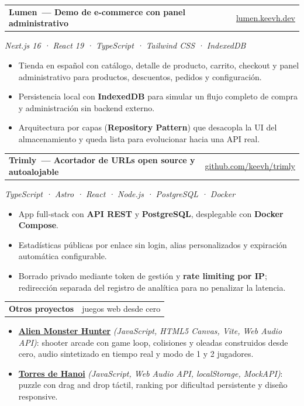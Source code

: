 \documentclass[a4paper,10.5pt]{article}
\makeatletter
\newcommand{\entry}[2]{%
  \noindent\begin{tabularx}{\textwidth}{@{}X@{}r@{}}
    \textbf{#1} & {\color{muted}\small #2}
  \end{tabularx}\par
}
\newcommand{\stack}[1]{{\color{accentdark}\small\itshape #1}\par\vspace{1pt}}
\makeatother
\begin{document}
\entry{Lumen~\textcolor{muted}{\small— Demo de e-commerce con panel administrativo}}{\href{https://lumen.keevh.dev/}{\color{accentdark}\small lumen.keevh.dev}}
\stack{Next.js 16 · React 19 · TypeScript · Tailwind CSS · IndexedDB}
\begin{itemize}
  \small
  \item Tienda en español con catálogo, detalle de producto, carrito, checkout y panel administrativo para productos, descuentos, pedidos y configuración.
  \item Persistencia local con \textbf{IndexedDB} para simular un flujo completo de compra y administración sin backend externo.
  \item Arquitectura por capas (\textbf{Repository Pattern}) que desacopla la UI del almacenamiento y queda lista para evolucionar hacia una API real.
\end{itemize}
\vspace{4pt}

\entry{Trimly~\textcolor{muted}{\small— Acortador de URLs open source y autoalojable}}{\href{https://github.com/keevh/trimly}{\color{accentdark}\small github.com/keevh/trimly}}
\stack{TypeScript · Astro · React · Node.js · PostgreSQL · Docker}
\begin{itemize}
  \small
  \item App full-stack con \textbf{API REST} y \textbf{PostgreSQL}, desplegable con \textbf{Docker Compose}.
  \item Estadísticas públicas por enlace sin login, alias personalizados y expiración automática configurable.
  \item Borrado privado mediante token de gestión y \textbf{rate limiting por IP}; redirección separada del registro de analítica para no penalizar la latencia.
\end{itemize}
\vspace{4pt}

\entry{Otros proyectos}{\textcolor{muted}{\small juegos web desde cero}}
\begin{itemize}
  \small
  \item \textbf{\href{https://keevh.github.io/Alien-Monster-Hunter/}{\color{ink}Alien Monster Hunter}} \textcolor{accentdark}{\itshape(JavaScript, HTML5 Canvas, Vite, Web Audio API)}: shooter arcade con game loop, colisiones y oleadas construidos desde cero, audio sintetizado en tiempo real y modo de 1 y 2 jugadores.
  \item \textbf{\href{https://keevh.github.io/torres-de-hanoi/}{\color{ink}Torres de Hanoi}} \textcolor{accentdark}{\itshape(JavaScript, Web Audio API, localStorage, MockAPI)}: puzzle con drag and drop táctil, ranking por dificultad persistente y diseño responsive.
\end{itemize}
\end{document}
